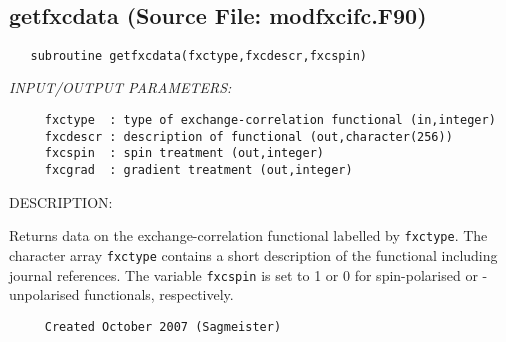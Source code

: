 \documentclass[11pt]{article}
\begin{document}
 
\mbox{}\hrulefill\ 
 
\subsection{getfxcdata (Source File: modfxcifc.F90)}


\begin{verbatim}   subroutine getfxcdata(fxctype,fxcdescr,fxcspin)\end{verbatim}{\em INPUT/OUTPUT PARAMETERS:}
\begin{verbatim}     fxctype  : type of exchange-correlation functional (in,integer)
     fxcdescr : description of functional (out,character(256))
     fxcspin  : spin treatment (out,integer)
     fxcgrad  : gradient treatment (out,integer)\end{verbatim}
{\sf DESCRIPTION:\\ }


     Returns data on the exchange-correlation functional labelled by
     {\tt fxctype}. The character array {\tt fxctype} contains a short
     description
     of the functional including journal references. The variable 
     {\tt fxcspin} is
     set to 1 or 0 for spin-polarised or -unpolarised functionals,
     respectively.
  
\begin{verbatim}     Created October 2007 (Sagmeister)\end{verbatim}















\end{document}
